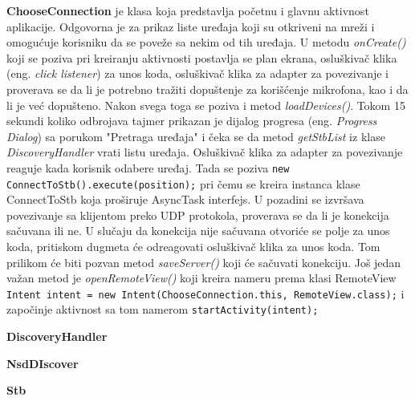 \documentclass[struktura.tex]{subfiles}
\begin{document}
\textbf{ChooseConnection} je klasa koja predstavlja početnu i glavnu aktivnost aplikacije. Odgovorna je za prikaz liste uređaja koji su otkriveni na mreži i omogućuje korisniku da se poveže sa nekim od tih uređaja. U metodu \textit{onCreate()} koji se poziva pri kreiranju aktivnosti postavlja se plan ekrana, osluškivač klika (eng. \textit{click listener}) za unos koda, osluškivač klika za adapter za povezivanje i proverava se da li je potrebno tražiti dopuštenje za korišćenje mikrofona, kao i da li je već dopušteno. Nakon svega toga se poziva i metod \textit{loadDevices()}. Tokom 15 sekundi koliko odbrojava tajmer prikazan je dijalog progresa (eng. \textit{Progress Dialog}) sa porukom "Pretraga uređaja" i čeka se da metod \textit{getStbList} iz klase \textit{DiscoveryHandler} vrati listu uređaja. Osluškivač klika za adapter za povezivanje reaguje kada korisnik odabere uređaj. Tada se poziva \verb|new ConnectToStb().execute(position);| pri čemu se kreira instanca klase ConnectToStb koja proširuje AsyncTask interfejs. U pozadini se izvršava povezivanje sa klijentom preko UDP protokola, proverava se da li je konekcija sačuvana ili ne. U slučaju da konekcija nije sačuvana otvoriće se polje za unos koda, pritiskom dugmeta će odreagovati osluškivač klika za unos koda. Tom prilikom će biti pozvan metod \textit{saveServer()} koji će sačuvati konekciju. Još jedan važan metod je \textit{openRemoteView()} koji kreira nameru prema klasi RemoteView \verb|Intent intent = new Intent(ChooseConnection.this, RemoteView.class);| i započinje aktivnost sa tom namerom \verb|startActivity(intent);|


\textbf{DiscoveryHandler}

\textbf{NsdDIscover}

\textbf{Stb}
\end{document}
